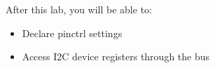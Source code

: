 
After this lab, you will be able to:

\begin{itemize}
\item Declare pinctrl settings
\item Access I2C device registers through the bus
\end{itemize}

